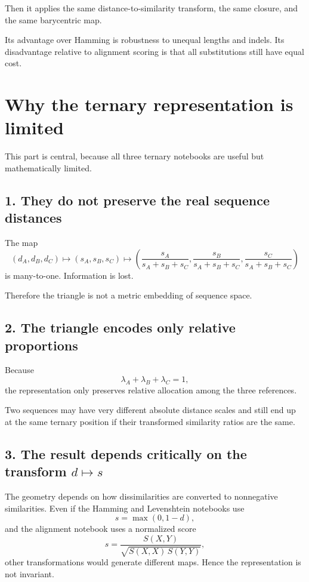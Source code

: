 \documentclass[11pt,a4paper]{article}
\begin{document}
Then it applies the same distance-to-similarity transform, the same closure, and the same barycentric map.

Its advantage over Hamming is robustness to unequal lengths and indels. Its disadvantage relative to alignment scoring is that all substitutions still have equal cost.

\section{Why the ternary representation is limited}

This part is central, because all three ternary notebooks are useful but mathematically limited.

\subsection{1. They do not preserve the real sequence distances}

The map
\[
(d_A,d_B,d_C)\mapsto (s_A,s_B,s_C)\mapsto
\left(
\frac{s_A}{s_A+s_B+s_C},
\frac{s_B}{s_A+s_B+s_C},
\frac{s_C}{s_A+s_B+s_C}
\right)
\]
is many-to-one. Information is lost.

Therefore the triangle is not a metric embedding of sequence space.

\subsection{2. The triangle encodes only relative proportions}

Because
\[
\lambda_A+\lambda_B+\lambda_C=1,
\]
the representation only preserves relative allocation among the three references.

Two sequences may have very different absolute distance scales and still end up at the same ternary position if their transformed similarity ratios are the same.

\subsection{3. The result depends critically on the transform $d\mapsto s$}

The geometry depends on how dissimilarities are converted to nonnegative similarities. Even if the Hamming and Levenshtein notebooks use
\[
s=\max(0,1-d),
\]
and the alignment notebook uses a normalized score
\[
s=\frac{S(X,Y)}{\sqrt{S(X,X)\,S(Y,Y)}},
\]
other transformations would generate different maps. Hence the representation is not invariant.
\end{document}
